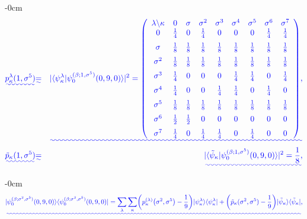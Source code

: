 \documentclass[quantumrep,article,submit,pdftex,moreauthors]{Definitions/mdpi}
\providecommand{\DIFadd}[1]{{\protect\color{blue}\uwave{#1}}} %
\begin{document}
\begin{adjustwidth}{-\extralength}{0cm}
\begin{eqnarray}
  \DIFadd{p_{\kappa}^{\lambda}(1,\sigma^{5})
  }&\DIFadd{=}& \DIFadd{|\langle \psi_{\kappa }^{\lambda}
  |\psi_{0}^{(\beta ;1,\sigma ^{5})}(0,9,0)\rangle|^{2}
  = \left(\begin{array}{ccccccccc} \lambda \backslash \kappa  & 0 & \sigma  &
      \sigma ^{2} & \sigma ^{3} & \sigma^{4} & \sigma ^{5} & \sigma ^{6} &
      \sigma ^{7} \\ 
    0 & \frac{1}{4} & 0 & \frac{1}{4} & 0 & 0 & 0 & \frac{1}{4} & \frac{1}{4} \\
    [6pt]
    \sigma & \frac{1}{8} & \frac{1}{8} & \frac{1}{8} & \frac{1}{8} & \frac{1}{8}
           & \frac{1}{8} & \frac{1}{8} & \frac{1}{8} \\ [6pt]
    \sigma^{2} & \frac{1}{8} & \frac{1}{8} & \frac{1}{8} & \frac{1}{8} &
    \frac{1}{8} & \frac{1}{8} & \frac{1}{8} & \frac{1}{8} \\  [6pt]
    \sigma^{3} & \frac{1}{4} & 0 & 0 & 0 & \frac{1}{4} & \frac{1}{4} & 0 &
    \frac{1}{4} \\  [6pt] \sigma^{4} & \frac{1}{4} & 0 & 0 & \frac{1}{4} &
    \frac{1}{4} & 0 & \frac{1}{4} & 0 \\  [6pt]
    \sigma^{5} & \frac{1}{8} & \frac{1}{8} & \frac{1}{8} & \frac{1}{8} &
    \frac{1}{8} & \frac{1}{8} & \frac{1}{8} & \frac{1}{8} \\  [6pt] \sigma^{6} &
    \frac{1}{2} & \frac{1}{2} & 0 & 0 & 0 & 0 & 0 & 0 \\  [6pt]
    \sigma^{7} & \frac{1}{4} & 0 & \frac{1}{4} & \frac{1}{4} & 0 & \frac{1}{4} &
    0 & 0
  \end{array}\right), }\\
  \DIFadd{\tilde{p}_{\kappa }(1,\sigma^{5})
  }&\DIFadd{=}& \DIFadd{|\langle \tilde\psi_\kappa | \psi_0^{(\beta;1,\sigma^5)}(0,9,0)\rangle|^2
  = \frac{1}{8},%
}\end{eqnarray}
\end{adjustwidth}

\DIFadd{and

}

\begin{adjustwidth}{-\extralength}{0cm}
\begin{equation}
  \DIFadd{|\psi_{0}^{(\beta;\sigma^{2},\sigma^{5})}(0,9,0)\rangle
  \langle \psi_{0}^{(\beta ; \sigma^{2},\sigma^{5})}(0,9,0)|
  = \sum_{\lambda }\sum_{\kappa} \left(
    p_{\kappa }^{(\lambda )}\left( \sigma ^{2},\sigma ^{5}\right) -\frac{1}{9}
  \right)
  |\psi_{\kappa}^{\lambda}\rangle \langle \psi_{\kappa}^{\lambda }|
  + \left( \tilde{p}_{\kappa }(\sigma ^{2},\sigma ^{5})-\frac{1}{9} \right)
  |\tilde{\psi}_{\kappa }\rangle \langle \tilde{\psi}_{\kappa }|,
  }
  \label{nac recon}
\end{equation}
\end{adjustwidth}
\end{document}
